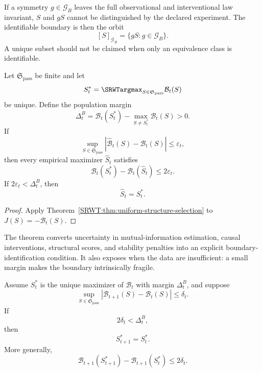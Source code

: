 
If a symmetry \(g\in\mathcal G_B\) leaves the full observational and
interventional law invariant, \(S\) and \(gS\) cannot be distinguished by the
declared experiment. The identifiable boundary is then the orbit
\[
[S]_{\mathcal G_B}
=
\{gS:g\in\mathcal G_B\}.
\]
A unique subset should not be claimed when only an equivalence class is
identifiable.


\begin{SRWTtheorem}\label{SRWT:thm:heldout-boundary-recovery}
Let \(\mathfrak S_{\mathrm{pass}}\) be finite and let
\[
S_t^*
=
\SRWTargmax_{S\in\mathfrak S_{\mathrm{pass}}}
\mathcal B_t(S)
\]
be unique. Define the population margin
\[
\Delta_t^B
=
\mathcal B_t(S_t^*)
-
\max_{S\neq S_t^*}\mathcal B_t(S)>0.
\]
If
\[
\sup_{S\in\mathfrak S_{\mathrm{pass}}}
\left|
\widehat{\mathcal B}_t(S)-\mathcal B_t(S)
\right|
\leq\varepsilon_t,
\]
then every empirical maximizer \(\widehat S_t\) satisfies
\[
\boxed{
\mathcal B_t(S_t^*)-
\mathcal B_t(\widehat S_t)
\leq2\varepsilon_t.
}
\]
If \(2\varepsilon_t<\Delta_t^B\), then
\[
\boxed{\widehat S_t=S_t^*.}
\]
\end{SRWTtheorem}

\begin{proof}
Apply Theorem~\ref{SRWT:thm:uniform-structure-selection} to
\(J(S)=-\mathcal B_t(S)\).
\end{proof}

The theorem converts uncertainty in mutual-information estimation, causal
interventions, structural scores, and stability penalties into an explicit
boundary-identification condition. It also exposes when the data are
insufficient: a small margin makes the boundary intrinsically fragile.


\begin{SRWTtheorem}
\label{SRWT:thm:boundary-drift-stability}
Assume \(S_t^*\) is the unique maximizer of \(\mathcal B_t\) with margin
\(\Delta_t^B\), and suppose
\[
\sup_{S\in\mathfrak S_{\mathrm{pass}}}
|\mathcal B_{t+1}(S)-\mathcal B_t(S)|
\leq\delta_t.
\]
If
\[
2\delta_t<\Delta_t^B,
\]
then
\[
\boxed{S_{t+1}^*=S_t^*.}
\]
More generally,
\[
\mathcal B_{t+1}(S_{t+1}^*)
-
\mathcal B_{t+1}(S_t^*)
\leq2\delta_t.
\]
\end{SRWTtheorem}

